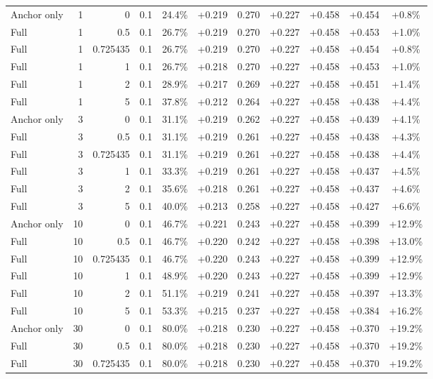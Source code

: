 \begin{table}[htbp]
\begin{tabular}{lrrrccccccc}
Anchor only & 1 & 0 & 0.1 & 24.4\% & +0.219 & 0.270 & +0.227 & +0.458 & +0.454 & +0.8\% \\
Full & 1 & 0.5 & 0.1 & 26.7\% & +0.219 & 0.270 & +0.227 & +0.458 & +0.453 & +1.0\% \\
Full & 1 & 0.725435 & 0.1 & 26.7\% & +0.219 & 0.270 & +0.227 & +0.458 & +0.454 & +0.8\% \\
Full & 1 & 1 & 0.1 & 26.7\% & +0.218 & 0.270 & +0.227 & +0.458 & +0.453 & +1.0\% \\
Full & 1 & 2 & 0.1 & 28.9\% & +0.217 & 0.269 & +0.227 & +0.458 & +0.451 & +1.4\% \\
Full & 1 & 5 & 0.1 & 37.8\% & +0.212 & 0.264 & +0.227 & +0.458 & +0.438 & +4.4\% \\
Anchor only & 3 & 0 & 0.1 & 31.1\% & +0.219 & 0.262 & +0.227 & +0.458 & +0.439 & +4.1\% \\
Full & 3 & 0.5 & 0.1 & 31.1\% & +0.219 & 0.261 & +0.227 & +0.458 & +0.438 & +4.3\% \\
Full & 3 & 0.725435 & 0.1 & 31.1\% & +0.219 & 0.261 & +0.227 & +0.458 & +0.438 & +4.4\% \\
Full & 3 & 1 & 0.1 & 33.3\% & +0.219 & 0.261 & +0.227 & +0.458 & +0.437 & +4.5\% \\
Full & 3 & 2 & 0.1 & 35.6\% & +0.218 & 0.261 & +0.227 & +0.458 & +0.437 & +4.6\% \\
Full & 3 & 5 & 0.1 & 40.0\% & +0.213 & 0.258 & +0.227 & +0.458 & +0.427 & +6.6\% \\
Anchor only & 10 & 0 & 0.1 & 46.7\% & +0.221 & 0.243 & +0.227 & +0.458 & +0.399 & +12.9\% \\
Full & 10 & 0.5 & 0.1 & 46.7\% & +0.220 & 0.242 & +0.227 & +0.458 & +0.398 & +13.0\% \\
Full & 10 & 0.725435 & 0.1 & 46.7\% & +0.220 & 0.243 & +0.227 & +0.458 & +0.399 & +12.9\% \\
Full & 10 & 1 & 0.1 & 48.9\% & +0.220 & 0.243 & +0.227 & +0.458 & +0.399 & +12.9\% \\
Full & 10 & 2 & 0.1 & 51.1\% & +0.219 & 0.241 & +0.227 & +0.458 & +0.397 & +13.3\% \\
Full & 10 & 5 & 0.1 & 53.3\% & +0.215 & 0.237 & +0.227 & +0.458 & +0.384 & +16.2\% \\
Anchor only & 30 & 0 & 0.1 & 80.0\% & +0.218 & 0.230 & +0.227 & +0.458 & +0.370 & +19.2\% \\
Full & 30 & 0.5 & 0.1 & 80.0\% & +0.218 & 0.230 & +0.227 & +0.458 & +0.370 & +19.2\% \\
Full & 30 & 0.725435 & 0.1 & 80.0\% & +0.218 & 0.230 & +0.227 & +0.458 & +0.370 & +19.2\% \\

\end{tabular}
\end{table}
